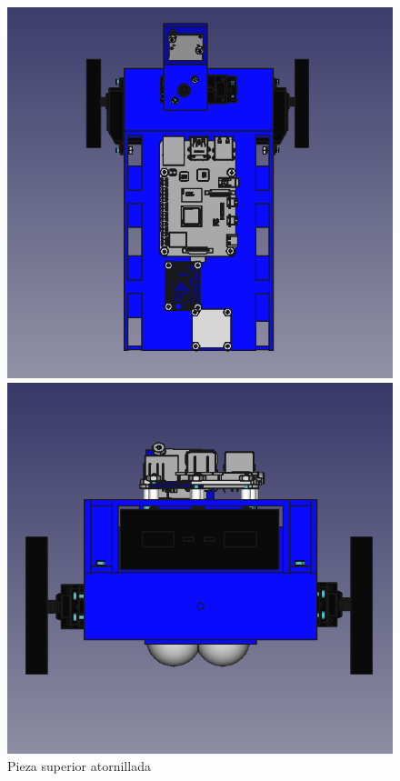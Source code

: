 \begin{figure}[ht!]
	\centering
	\begin{minipage}{0.45\linewidth}
		\centering
		\includegraphics[width=\linewidth]{figs/cap5/superior1m.png}
		\caption*{\centering}
	\end{minipage}
	\hspace{1cm}
	\begin{minipage}{0.45\linewidth}
		\centering
		\includegraphics[width=\linewidth]{figs/cap5/superior2m.png}
		\caption*{\centering}
	\end{minipage}
	\caption{Pieza superior atornillada}
	\label{fig:psuperiormontada}
\end{figure}


